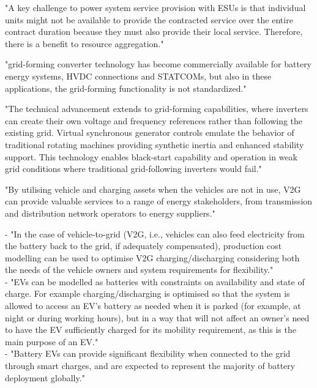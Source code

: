 "A key challenge to power system service provision with ESUs is that individual units might not be available to provide the contracted service over the entire contract duration because they must also provide their local service. Therefore, there is a benefit to resource aggregation." \cite{olivier_megel_scheduling_2015}

"grid-forming converter technology has become commercially available for battery energy systems, HVDC connections and STATCOMs, but also in these applications, the grid-forming functionality is not standardized." \cite{noauthor_nordic_2023}

"The technical advancement extends to grid-forming capabilities, where inverters can create their own voltage and frequency references rather than following the existing grid. Virtual synchronous generator controls emulate the behavior of traditional rotating machines  providing synthetic inertia and enhanced stability support. This technology enables black-start capability and operation in weak grid conditions where traditional grid-following inverters would fail."



"By utilising vehicle and charging assets when the vehicles are not in use, V2G can provide valuable services to a range of energy stakeholders, from transmission and distribution network operators to energy suppliers." \cite{aunedi_whole-system_2020}


- "In the case of vehicle-to-grid (V2G, i.e., vehicles can also feed electricity from the battery back to the grid, if adequately compensated), production cost modelling can be used to optimise V2G charging/discharging considering both the needs of the vehicle owners and system requirements for flexibility." \\
- "EVs can be modelled as batteries with constraints on availability and state of charge. For example charging/discharging is optimised so that the system is allowed to access an EV's battery as needed when it is parked (for example, at night or during working hours), but in a way that will not affect an owner's need to have the EV sufficiently charged for its mobility requirement, as this is the main purpose of an EV."\\
- "Battery EVs can provide significant flexibility when connected to the grid through smart charges, and are expected to represent the majority of battery deployment globally." \cite{emanuele_taibi_power_2018}

